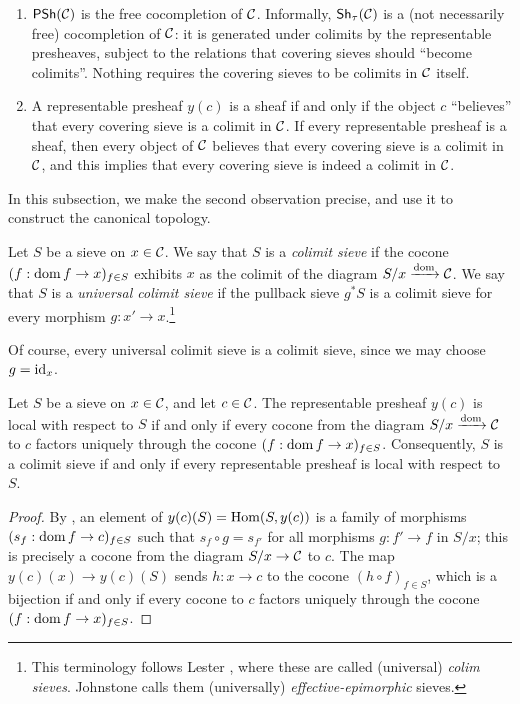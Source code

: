 \begin{enumerate}
    \item $\mathsf{PSh}(\mathcal{C})$ is the free cocompletion of $\mathcal{C}$. Informally, $\mathsf{Sh}_{\tau}(\mathcal{C})$ is a (not necessarily free) cocompletion of $\mathcal{C}$: it is generated under colimits by the representable presheaves, subject to the relations that covering sieves should ``become colimits''. Nothing requires the covering sieves to be colimits in $\mathcal{C}$ itself.
    \item A representable presheaf $y(c)$ is a sheaf if and only if the object $c$ ``believes'' that every covering sieve is a colimit in $\mathcal{C}$. If every representable presheaf is a sheaf, then every object of $\mathcal{C}$ believes that every covering sieve is a colimit in $\mathcal{C}$, and this implies that every covering sieve is indeed a colimit in $\mathcal{C}$.
\end{enumerate}
In this subsection, we make the second observation precise, and use it to construct the canonical topology.

\begin{definition}\label{def:chap:sheaves:sec:sites:colimit sieve}
    Let $S$ be a sieve on $x \in \mathcal{C}$. We say that $S$ is a \emph{colimit sieve} if the cocone $(f : \operatorname{dom} f \to x)_{f \in S}$ exhibits $x$ as the colimit of the diagram $S/x \xrightarrow{\operatorname{dom}} \mathcal{C}$. We say that $S$ is a \emph{universal colimit sieve} if the pullback sieve $g^* S$ is a colimit sieve for every morphism $g : x' \to x$.\footnote{This terminology follows Lester \cite{lester_covers_2019,lester_canonical_2019}, where these are called (universal) \emph{colim sieves}. Johnstone \cite[\nopp C2.1]{johnstone_sketches_2002} calls them (universally) \emph{effective-epimorphic} sieves.}
\end{definition}

Of course, every universal colimit sieve is a colimit sieve, since we may choose $g = \operatorname{id}_x$.

\begin{proposition}\label{prop:chap:sheaves:sec:sites:when representables are sheaves}
    Let $S$ be a sieve on $x \in \mathcal{C}$, and let $c \in \mathcal{C}$. The representable presheaf $y(c)$ is local with respect to $S$ if and only if every cocone from the diagram $S/x \xrightarrow{\operatorname{dom}} \mathcal{C}$ to $c$ factors uniquely through the cocone $(f : \operatorname{dom} f \to x)_{f \in S}$. Consequently, $S$ is a colimit sieve if and only if every representable presheaf is local with respect to $S$.
\end{proposition}
\begin{proof}
    By , an element of $y(c)(S) = \operatorname{Hom}(S,y(c))$ is a family of morphisms $(s_f : \operatorname{dom} f \to c)_{f \in S}$ such that $s_f \circ g = s_{f'}$ for all morphisms $g : f' \to f$ in $S/x$; this is precisely a cocone from the diagram $S/x \to \mathcal{C}$ to $c$. The map $y(c)(x) \to y(c)(S)$ sends $h : x \to c$ to the cocone $(h \circ f)_{f \in S}$, which is a bijection if and only if every cocone to $c$ factors uniquely through the cocone $(f : \operatorname{dom} f \to x)_{f \in S}$.
\end{proof}


